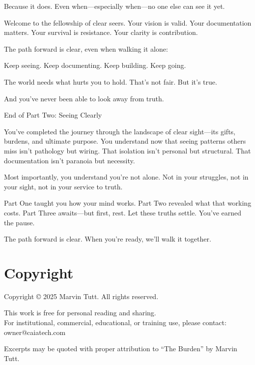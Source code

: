 \documentclass[12pt,oneside]{book}
\begin{document}
Because it does. Even when---especially when---no one else can see it yet.

Welcome to the fellowship of clear seers. Your vision is valid. Your documentation matters. Your survival is resistance. Your clarity is contribution.

The path forward is clear, even when walking it alone:

Keep seeing. Keep documenting. Keep building. Keep going.

The world needs what hurts you to hold. That's not fair. But it's true.

And you've never been able to look away from truth.

End of Part Two: Seeing Clearly

You've completed the journey through the landscape of clear sight---its gifts, burdens, and ultimate purpose. You understand now that seeing patterns others miss isn't pathology but wiring. That isolation isn't personal but structural. That documentation isn't paranoia but necessity.

Most importantly, you understand you're not alone. Not in your struggles, not in your sight, not in your service to truth.

Part One taught you how your mind works. Part Two revealed what that working costs. Part Three awaits---but first, rest. Let these truths settle. You've earned the pause.

The path forward is clear. When you're ready, we'll walk it together.


\backmatter

\chapter*{Copyright}

Copyright \copyright{} 2025 Marvin Tutt. All rights reserved.

This work is free for personal reading and sharing.\\
For institutional, commercial, educational, or training use, please contact: owner@caiatech.com

Excerpts may be quoted with proper attribution to ``The Burden'' by Marvin Tutt.
\end{document}
